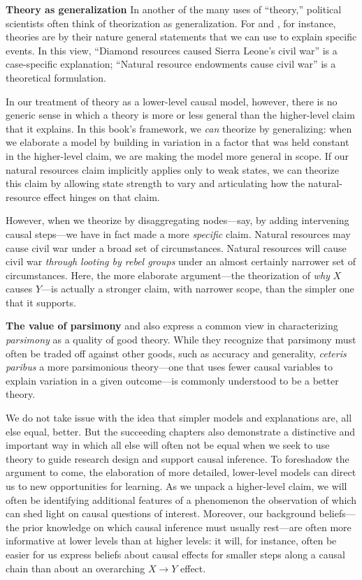 \documentclass[
  12pt,
]{book}
\begin{document}
\textbf{Theory as generalization} In another of the many uses of ``theory,'' political scientists often think of theorization as generalization. For \citet{Van-Evera:1997} and \citet{przeworski1970logic}, for instance, theories are by their nature general statements that we can use to explain specific events. In this view, ``Diamond resources caused Sierra Leone's civil war'' is a case-specific explanation; ``Natural resource endowments cause civil war'' is a theoretical formulation.

In our treatment of theory as a lower-level causal model, however, there is no generic sense in which a theory is more or less general than the higher-level claim that it explains. In this book's framework, we \emph{can} theorize by generalizing: when we elaborate a model by building in variation in a factor that was held constant in the higher-level claim, we are making the model more general in scope. If our natural resources claim implicitly applies only to weak states, we can theorize this claim by allowing state strength to vary and articulating how the natural-resource effect hinges on that claim.

However, when we theorize by disaggregating nodes---say, by adding intervening causal steps---we have in fact made a more \emph{specific} claim. Natural resources may cause civil war under a broad set of circumstances. Natural resources will cause civil war \emph{through looting by rebel groups} under an almost certainly narrower set of circumstances. Here, the more elaborate argument---the theorization of \emph{why} \(X\) causes \(Y\)---is actually a stronger claim, with narrower scope, than the simpler one that it supports.

\textbf{The value of parsimony} \citet{Van-Evera:1997} and \citet{przeworski1970logic} also express a common view in characterizing \emph{parsimony} as a quality of good theory. While they recognize that parsimony must often be traded off against other goods, such as accuracy and generality, \emph{ceteris paribus} a more parsimonious theory---one that uses fewer causal variables to explain variation in a given outcome---is commonly understood to be a better theory.

We do not take issue with the idea that simpler models and explanations are, all else equal, better. But the succeeding chapters also demonstrate a distinctive and important way in which all else will often not be equal when we seek to use theory to guide research design and support causal inference. To foreshadow the argument to come, the elaboration of more detailed, lower-level models can direct us to new opportunities for learning. As we unpack a higher-level claim, we will often be identifying additional features of a phenomenon the observation of which can shed light on causal questions of interest. Moreover, our background beliefs---the prior knowledge on which causal inference must usually rest---are often more informative at lower levels than at higher levels: it will, for instance, often be easier for us express beliefs about causal effects for smaller steps along a causal chain than about an overarching \(X \rightarrow Y\) effect.
\end{document}
